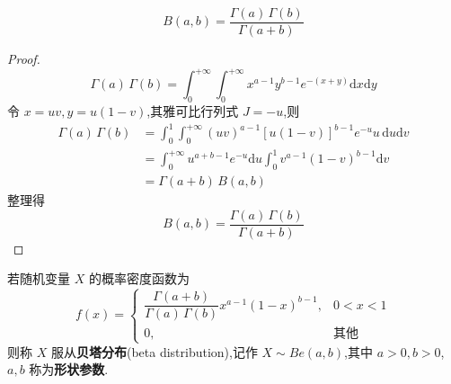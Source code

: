 \begin{property}
    \begin{equation}
        B(a,b) = \dfrac{\Gamma(a) \, \Gamma(b)}{\Gamma(a+b)}
    \end{equation}
\end{property}

\begin{proof}
    $$
    \Gamma(a) \, \Gamma(b) = \int_{0}^{+\infty} \int_{0}^{+\infty} x^{a-1} y^{b-1} e^{-(x+y)} \mathrm{d}x \mathrm{d}y
    $$
    令 $x = uv, y = u(1-v)$,其雅可比行列式 $J = -u$,则
    $$
    \begin{aligned}
        \Gamma(a) \, \Gamma(b) &= \int_{0}^{1} \int_{0}^{+\infty} (uv)^{a-1} [u(1-v)]^{b-1} e^{-u} u \, \mathrm{d}u \mathrm{d}v \\
        &= \int_{0}^{+\infty} u^{a+b-1} e^{-u} \mathrm{d}u \int_{0}^{1} v^{a-1} (1-v)^{b-1} \mathrm{d}v \\
        &= \Gamma(a+b) \, B(a,b)
    \end{aligned}
    $$
    整理得
    $$
    B(a,b) = \dfrac{\Gamma(a) \, \Gamma(b)}{\Gamma(a+b)}
    $$

    \vspace{-1.5em}
\end{proof}

\begin{definition}
    \indent 若随机变量 $X$ 的概率密度函数为
    \begin{equation}
        f(x) = \begin{cases}
            \dfrac{\Gamma(a+b)}{\Gamma(a) \, \Gamma(b)} x^{a-1} (1-x)^{b-1}, & 0<x<1 \\[0.5em]
            0, & \text{其他}
        \end{cases}
    \end{equation}
    则称 $X$ 服从\textbf{贝塔分布}(beta distribution),记作 $X \sim Be(a,b)$,其中 $a>0, b>0$, $a,b$ 称为\textbf{形状参数}.
\end{definition}

